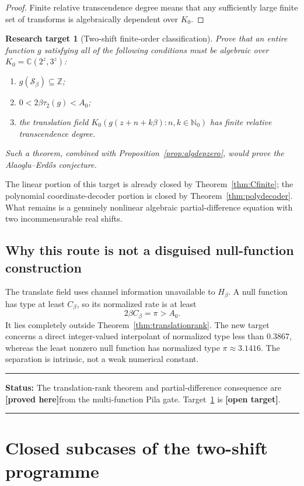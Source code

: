 \documentclass[11pt,oneside]{article}
\newtheorem{target}[theorem]{Research target}
\theoremstyle{definition}
\theoremstyle{remark}
\newcommand{\Nzero}{\mathbb N_0}
\newcommand{\Z}{\mathbb Z}
\newcommand{\C}{\mathbb C}
\newcommand{\Sbeta}{\mathcal S_\beta}
\newcommand{\Cbeta}{C_\beta}
\newcommand{\statusproved}{\textcolor{provedgreen}{\textbf{[proved here]}}}
\newcommand{\statusopen}{\textcolor{openviolet}{\textbf{[open target]}}}
\newenvironment{statusbox}[1]
{\begin{center}\begin{minipage}{0.94\textwidth}\raggedright\hrule\vspace{0.45em}\textbf{Status:} #1\par\vspace{0.35em}}
{\vspace{0.35em}\hrule\end{minipage}\end{center}}
\begin{document}
\begin{proof}
Finite relative transcendence degree means that any sufficiently large finite set of
transforms is algebraically dependent over $K_0$.
\end{proof}

\begin{target}[Two-shift finite-order classification]
\label{target:differenceclassification}
Prove that an entire function $g$ satisfying all of the following conditions must be
algebraic over $K_0=\C(2^z,3^z)$:
\begin{enumerate}
\item $g(\Sbeta)\subseteq\Z$;
\item $0<2\beta\tau_2(g)<A_0$;
\item the translation field
$K_0(g(z+n+k\beta):n,k\in\Nzero)$ has finite relative transcendence degree.
\end{enumerate}
Such a theorem, combined with Proposition~\ref{prop:algdepzero}, would prove the
Alaoglu--Erd\H{o}s conjecture.
\end{target}

The linear portion of this target is already closed by
Theorem~\ref{thm:Cfinite}; the polynomial coordinate-decoder portion is closed by
Theorem~\ref{thm:polydecoder}.  What remains is a genuinely nonlinear algebraic
partial-difference equation with two incommensurable real shifts.

\subsection{Why this route is not a disguised null-function construction}

The translate field uses channel information unavailable to $H_\beta$.  A null function
has type at least $\Cbeta$, so its normalized rate is at least
\[
 2\beta\Cbeta=\pi>A_0.
\]
It lies completely outside Theorem~\ref{thm:translationrank}.  The new target concerns a
direct integer-valued interpolant of normalized type less than $0.3867$, whereas the least
nonzero null function has normalized type $\pi\approx3.1416$.  The separation is intrinsic,
not a weak numerical constant.

\begin{statusbox}{The translation-rank theorem and partial-difference consequence are
\statusproved from the multi-function Pila gate.  Target~\ref{target:differenceclassification}
is \statusopen.}
\end{statusbox}

\section{Closed subcases of the two-shift programme}
\label{sec:closedsubcases}
\end{document}
